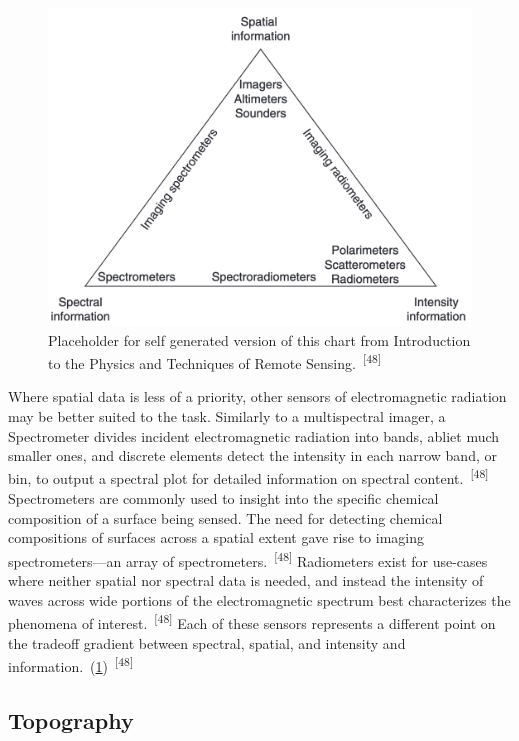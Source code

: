 \documentclass{article}
\begin{document}
\begin{figure}
    \centering
    \includegraphics[width=0.6\linewidth]{images/remote-sensor-tradeoff.png}
    \caption{Placeholder for self generated version of this chart from Introduction to the Physics and Techniques of Remote Sensing.~\textsuperscript{[48]}}
    \label{figure14}
\end{figure}

\par{Where spatial data is less of a priority, other sensors of electromagnetic radiation may be better suited to the task. Similarly to a multispectral imager, a Spectrometer divides incident electromagnetic radiation into bands, abliet much smaller ones, and discrete elements detect the intensity in each narrow band, or bin, to output a spectral plot for detailed information on spectral content.~\textsuperscript{[48]} Spectrometers are commonly used to insight into the specific chemical composition of a surface being sensed. The need for detecting chemical compositions of surfaces across a spatial extent gave rise to imaging spectrometers---an array of spectrometers.~\textsuperscript{[48]} Radiometers exist for use-cases where neither spatial nor spectral data is needed, and instead the intensity of waves across wide portions of the electromagnetic spectrum best characterizes the phenomena of interest.~\textsuperscript{[48]} Each of these sensors represents a different point on the tradeoff gradient between spectral, spatial, and intensity and information.~(\cref{figure14})~\textsuperscript{[48]}}

{}


\par{}

\subsection{Topography}
\end{document}
